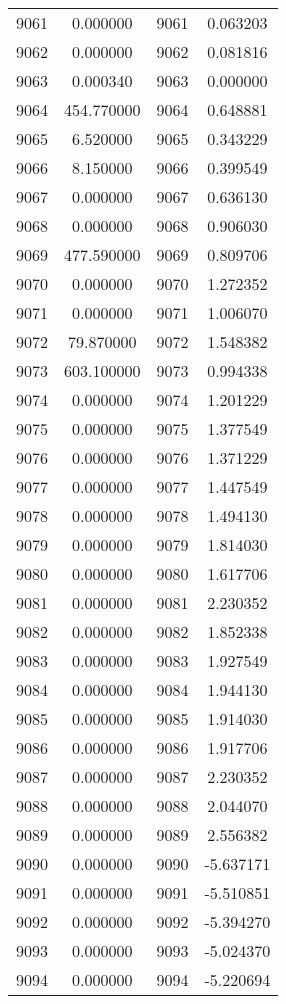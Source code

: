 \documentclass[12pt]{article}
\begin{document}
\begin{longtable}{@{}cccc@{}}
9061 & 0.000000 & 9061 & 0.063203 \\
9062 & 0.000000 & 9062 & 0.081816 \\
9063 & 0.000340 & 9063 & 0.000000 \\
9064 & 454.770000 & 9064 & 0.648881 \\
9065 & 6.520000 & 9065 & 0.343229 \\
9066 & 8.150000 & 9066 & 0.399549 \\
9067 & 0.000000 & 9067 & 0.636130 \\
9068 & 0.000000 & 9068 & 0.906030 \\
9069 & 477.590000 & 9069 & 0.809706 \\
9070 & 0.000000 & 9070 & 1.272352 \\
9071 & 0.000000 & 9071 & 1.006070 \\
9072 & 79.870000 & 9072 & 1.548382 \\
9073 & 603.100000 & 9073 & 0.994338 \\
9074 & 0.000000 & 9074 & 1.201229 \\
9075 & 0.000000 & 9075 & 1.377549 \\
9076 & 0.000000 & 9076 & 1.371229 \\
9077 & 0.000000 & 9077 & 1.447549 \\
9078 & 0.000000 & 9078 & 1.494130 \\
9079 & 0.000000 & 9079 & 1.814030 \\
9080 & 0.000000 & 9080 & 1.617706 \\
9081 & 0.000000 & 9081 & 2.230352 \\
9082 & 0.000000 & 9082 & 1.852338 \\
9083 & 0.000000 & 9083 & 1.927549 \\
9084 & 0.000000 & 9084 & 1.944130 \\
9085 & 0.000000 & 9085 & 1.914030 \\
9086 & 0.000000 & 9086 & 1.917706 \\
9087 & 0.000000 & 9087 & 2.230352 \\
9088 & 0.000000 & 9088 & 2.044070 \\
9089 & 0.000000 & 9089 & 2.556382 \\
9090 & 0.000000 & 9090 & -5.637171 \\
9091 & 0.000000 & 9091 & -5.510851 \\
9092 & 0.000000 & 9092 & -5.394270 \\
9093 & 0.000000 & 9093 & -5.024370 \\
9094 & 0.000000 & 9094 & -5.220694 \\

\end{longtable}
\end{document}
